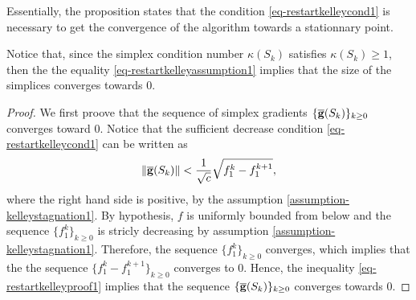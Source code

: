 Essentially, the proposition states that the condition \ref{eq-restartkelleycond1} is 
necessary to get the convergence of the algorithm towards a stationnary point.

Notice that, since the simplex condition number $\kappa(S_k)$ satisfies 
$\kappa(S_k) \geq 1$, then the the equality \ref{eq-restartkelleyassumption1} 
implies that the size of the simplices converges towards 0.

\begin{proof}
We first proove that the sequence of simplex gradients $\{\overline{\mathbf{g}}(S_k)\}_{k\geq 0}$ 
converges toward 0. 
Notice that the sufficient decrease condition \ref{eq-restartkelleycond1} can be written as 
\begin{eqnarray}
\label{eq-restartkelleyproof1}
\| \overline{\mathbf{g}}(S_k) \| < \frac{1}{\sqrt{c}} \sqrt{ f_1^k - f_1^{k+1} },
\end{eqnarray}
where the right hand side is positive, by the assumption \ref{assumption-kelleystagnation1}.
By hypothesis, $f$ is uniformly bounded from below and the sequence $\{f_1^k\}_{k\geq 0}$ is 
stricly decreasing by assumption \ref{assumption-kelleystagnation1}. 
Therefore, the sequence $\{f_1^k\}_{k\geq 0}$ converges, which implies that the the sequence 
$\{f_1^k - f_1^{k+1}\}_{k\geq 0}$ converges to 0.
Hence, the inequality \ref{eq-restartkelleyproof1} implies that the sequence $\{\overline{\mathbf{g}}(S_k)\}_{k\geq 0}$
converges towards 0.


\end{proof}
